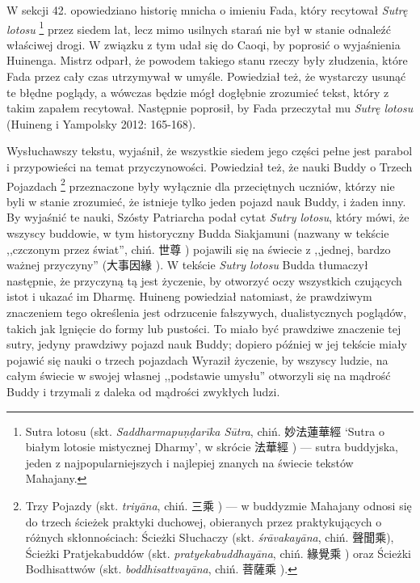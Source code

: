 W sekcji 42. opowiedziano historię mnicha o imieniu Fada, który recytował \textit{Sutrę lotosu}%
\footnote{Sutra lotosu (skt. \textit{Saddharmapu\d{n}\d{d}arīka Sūtra}, chiń. 妙法蓮華經  `Sutra o białym lotosie mistycznej Dharmy', w skrócie 法華經 ) --- sutra buddyjska, jeden z najpopularniejszych i najlepiej znanych na świecie tekstów Mahajany.} przez siedem lat,
lecz mimo usilnych starań nie był w stanie odnaleźć właściwej drogi.
W związku z tym udał się do Caoqi, by poprosić o wyjaśnienia  Huinenga.
Mistrz odparł, że powodem takiego stanu rzeczy były złudzenia, które Fada przez cały czas utrzymywał w umyśle.
Powiedział też, że wystarczy usunąć te błędne poglądy, a wówczas będzie mógł dogłębnie zrozumieć tekst, który z takim zapałem recytował.
Następnie poprosił, by Fada przeczytał mu \textit{Sutrę lotosu}
(Huineng i Yampolsky 2012: 165-168).

Wysłuchawszy tekstu, wyjaśnił, że wszystkie siedem jego części pełne jest parabol i przypowieści na temat przyczynowości. %
Powiedział też, że nauki Buddy o Trzech Pojazdach%
\footnote{Trzy Pojazdy\label{Triyana} (skt. \textit{triyāna}, chiń. 三乘 ) --- w buddyzmie Mahajany odnosi się do trzech ścieżek praktyki duchowej, obieranych przez praktykujących o różnych skłonnościach: Ścieżki Słuchaczy (skt. \textit{śrāvakayāna}, chiń. 聲聞乘), Ścieżki Pratjekabuddów (skt. \textit{pratyekabuddhayāna}, chiń. 緣覺乘 ) oraz Ścieżki Bodhisattwów (skt. \textit{boddhisattvayāna}, chiń. 菩薩乘 ).}
przeznaczone były wyłącznie dla przeciętnych uczniów, którzy nie byli w stanie zrozumieć, że istnieje tylko jeden pojazd nauk Buddy, i żaden inny.
By wyjaśnić te nauki, Szósty Patriarcha podał cytat \textit{Sutry lotosu}, który mówi, że wszyscy buddowie, w tym historyczny Budda Siakjamuni (nazwany w tekście ,,czczonym przez świat'', chiń. 世尊 ) pojawili się na świecie z ,,jednej, bardzo ważnej przyczyny'' (大事因緣 ).
W tekście \textit{Sutry lotosu} Budda tłumaczył następnie, że przyczyną tą jest życzenie, by otworzyć oczy wszystkich czujących istot i ukazać im Dharmę.
Huineng powiedział natomiast, że prawdziwym znaczeniem tego określenia jest odrzucenie fałszywych, dualistycznych poglądów, takich jak lgnięcie do formy lub pustości.
To miało być prawdziwe znaczenie tej sutry, jedyny prawdziwy pojazd nauk Buddy; dopiero później w jej tekście miały pojawić się nauki o trzech pojazdach
Wyraził życzenie, by wszyscy ludzie, na całym świecie w swojej własnej ,,podstawie umysłu''  otworzyli się na mądrość Buddy i trzymali z daleka od mądrości zwykłych ludzi.

